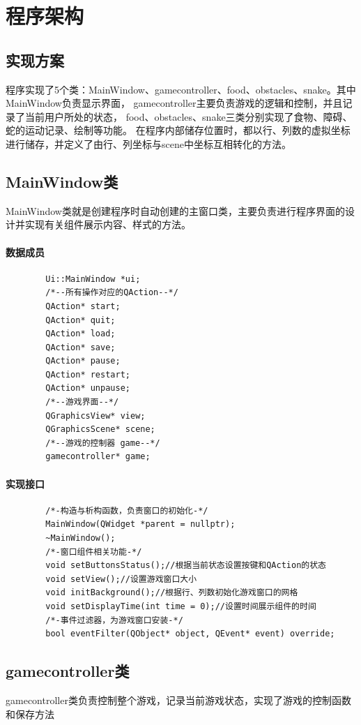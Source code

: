 \documentclass[utf-8]{ctexart}
\begin{document}
    \section{程序架构}
    \subsection{实现方案}
    程序实现了5个类：MainWindow、gamecontroller、food、obstacles、snake。其中MainWindow负责显示界面，
    gamecontroller主要负责游戏的逻辑和控制，并且记录了当前用户所处的状态，
    food、obstacles、snake三类分别实现了食物、障碍、蛇的运动记录、绘制等功能。
    在程序内部储存位置时，都以行、列数的虚拟坐标进行储存，并定义了由行、列坐标与scene中坐标互相转化的方法。
    \subsection{MainWindow类}
    MainWindow类就是创建程序时自动创建的主窗口类，主要负责进行程序界面的设计并实现有关组件展示内容、样式的方法。
    \paragraph{数据成员}
    \begin{lstlisting}
        Ui::MainWindow *ui;
        /*--所有操作对应的QAction--*/
        QAction* start;
        QAction* quit;
        QAction* load;
        QAction* save;
        QAction* pause;
        QAction* restart;
        QAction* unpause;
        /*--游戏界面--*/
        QGraphicsView* view;
        QGraphicsScene* scene;
        /*--游戏的控制器 game--*/
        gamecontroller* game;
    \end{lstlisting}
    \paragraph{实现接口}
    \begin{lstlisting}
        /*-构造与析构函数，负责窗口的初始化-*/
        MainWindow(QWidget *parent = nullptr);
        ~MainWindow();
        /*-窗口组件相关功能-*/
        void setButtonsStatus();//根据当前状态设置按键和QAction的状态
        void setView();//设置游戏窗口大小
        void initBackground();//根据行、列数初始化游戏窗口的网格
        void setDisplayTime(int time = 0);//设置时间展示组件的时间
        /*-事件过滤器，为游戏窗口安装-*/
        bool eventFilter(QObject* object, QEvent* event) override;
    \end{lstlisting}
    \subsection{gamecontroller类}
    gamecontroller类负责控制整个游戏，记录当前游戏状态，实现了游戏的控制函数和保存方法
\end{document}
